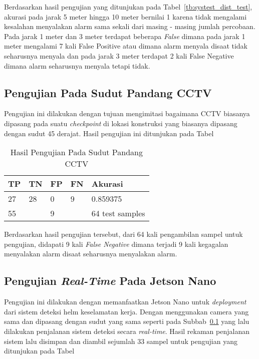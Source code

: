 \par Berdasarkan hasil pengujian yang ditunjukan pada Tabel~\ref{tb:systest_dist_test}, akurasi pada jarak 5 meter hingga 10 meter bernilai 1 karena tidak mengalami kesalahan menyalakan alarm sama sekali dari masing - masing jumlah percobaan. Pada jarak 1 meter dan 3 meter terdapat beberapa \emph{False} dimana pada jarak 1 meter mengalami 7 kali False Positive atau dimana alarm menyala disaat tidak seharusnya menyala dan pada jarak 3 meter terdapat 2 kali False Negative dimana alarm seharusnya menyala tetapi tidak.

\subsection{Pengujian Pada Sudut Pandang CCTV}
\label{subsec:systest_test_cctv}

\par Pengujian ini dilakukan dengan tujuan mengimitasi bagaimana CCTV biasanya dipasang pada suatu \emph{checkpoint} di lokasi konstruksi yang biasanya dipasang dengan sudut 45 derajat. Hasil pengujian ini ditunjukan pada Tabel


\begin{table}
    \centering
    \caption{Hasil Pengujian Pada Sudut Pandang CCTV}
    \label{tb:systest_cctv}
    \begin{tabular}{|l|l|l|l|l|} 
    \hline
    TP & TN & FP & FN & Akurasi         \\ 
    \hline
    27 & 28 & 0  & 9  & 0.859375         \\ 
    \hline
    \multicolumn{2}{|l|}{55}   & \multicolumn{2}{l|}{9} & 64 test samples  \\
    \hline
    \end{tabular}
\end{table}

Berdasarkan hasil pengujian tersebut, dari 64 kali pengambilan sampel untuk pengujian, didapati 9 kali \emph{False Negative} dimana terjadi 9 kali kegagalan menyalakan alarm disaat seharusnya menyalakan alarm.

\subsection{Pengujian \emph{Real-Time} Pada Jetson Nano}
\label{subsec:systest_test_jetsonrealtime}

\par Pengujian ini dilakukan dengan memanfaatkan Jetson Nano untuk \emph{deployment} dari sistem deteksi helm keselamatan kerja. Dengan menggunakan camera yang sama dan dipasang dengan sudut yang sama seperti pada Subbab~\ref{subsec:systest_test_cctv} yang lalu dilakukan penjalanan sistem deteksi secara \emph{real-time}. Hasil rekaman penjalanan sistem lalu disimpan dan diambil sejumlah 33 sampel untuk pengujian yang ditunjukan pada Tabel


